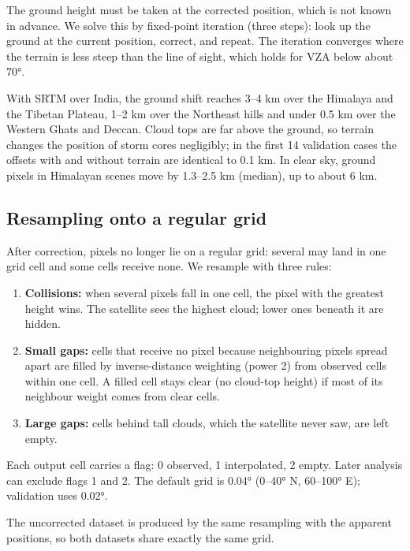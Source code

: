 The ground height must be taken at the corrected position, which is not known in advance. We solve this by fixed-point iteration (three steps): look up the ground at the current position, correct, and repeat. The iteration converges where the terrain is less steep than the line of sight, which holds for VZA below about 70°.

With SRTM over India, the ground shift reaches 3--4 km over the Himalaya and the Tibetan Plateau, 1--2 km over the Northeast hills and under 0.5 km over the Western Ghats and Deccan. Cloud tops are far above the ground, so terrain changes the position of storm cores negligibly; in the first 14 validation cases the offsets with and without terrain are identical to 0.1 km. In clear sky, ground pixels in Himalayan scenes move by 1.3--2.5 km (median), up to about 6 km.

\subsection{Resampling onto a regular grid}\label{sec:3.5}

After correction, pixels no longer lie on a regular grid: several may land in one grid cell and some cells receive none. We resample with three rules:

\begin{enumerate}
\def\labelenumi{\arabic{enumi}.}
\tightlist
\item
  \textbf{Collisions:} when several pixels fall in one cell, the pixel with the greatest height wins. The satellite sees the highest cloud; lower ones beneath it are hidden.
\item
  \textbf{Small gaps:} cells that receive no pixel because neighbouring pixels spread apart are filled by inverse-distance weighting (power 2) from observed cells within one cell. A filled cell stays clear (no cloud-top height) if most of its neighbour weight comes from clear cells.
\item
  \textbf{Large gaps:} cells behind tall clouds, which the satellite never saw, are left empty.
\end{enumerate}

Each output cell carries a flag: 0 observed, 1 interpolated, 2 empty. Later analysis can exclude flags 1 and 2. The default grid is 0.04° (0--40° N, 60--100° E); validation uses 0.02°.

The uncorrected dataset is produced by the same resampling with the apparent positions, so both datasets share exactly the same grid.


